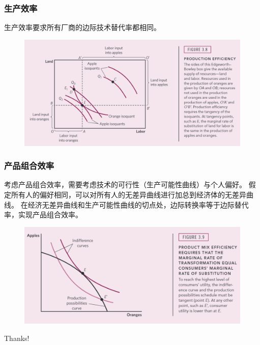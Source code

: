 \documentclass[aspectratio=169, 12pt]{beamer}
\begin{document}
\begin{frame}[plain]
    \frametitle{生产效率}
    生产效率要求所有厂商的边际技术替代率都相同。
    \begin{figure}
        \centering
        \begin{minipage}{1.0\linewidth}
            \centering
            \includegraphics[width=1.0\textwidth]{./resources/figure/proeff.png}
        \end{minipage}
    \end{figure}
\end{frame}

\begin{frame}[plain]
    \frametitle{产品组合效率}
    考虑产品组合效率，需要考虑技术的可行性（生产可能性曲线）与个人偏好。
    假定所有人的偏好相同，可以对所有人的无差异曲线进行加总到经济体的无差异曲线。
    在经济无差异曲线和生产可能性曲线的切点处，边际转换率等于边际替代率，实现产品组合效率。
    \begin{figure}
        \centering
        \begin{minipage}{1.0\linewidth}
            \centering
            \includegraphics[width=1.0\textwidth]{./resources/figure/promixeff.png}
        \end{minipage}
    \end{figure}
\end{frame}

\begin{frame}[standout]
    \begin{center}
        {\Huge\calligra Thanks!}
    \end{center}
\end{frame}
\end{document}

